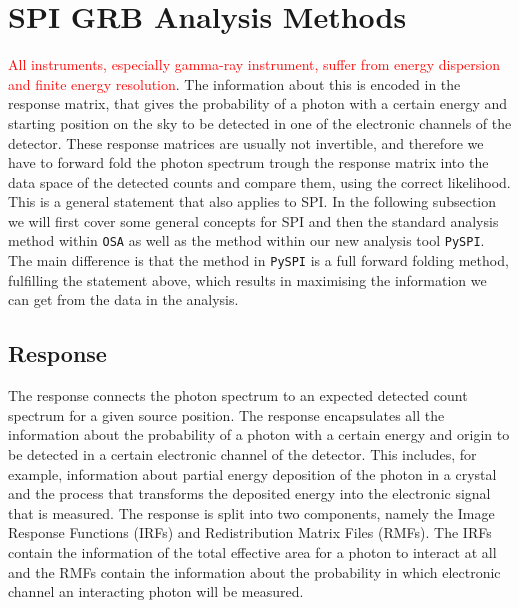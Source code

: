 \documentclass[twocolumn,traditabstract]{aa}
\newcommand{\BB}[1]{\textcolor{red}{\textsf{#1}}}
\begin{document}
\section{SPI GRB Analysis Methods}
\label{methods}
\BB{All instruments, especially gamma-ray instrument, suffer from energy dispersion and finite energy resolution}. The information about this is encoded in the response matrix, that gives the probability of a photon with a certain energy and starting position on the sky to be detected in one of the electronic channels of the detector. These response matrices are usually not invertible, and therefore we have to forward fold the photon spectrum trough the response matrix into the data space of the detected counts and compare them, using the correct likelihood. This is a general statement that also applies to SPI. In the following subsection we will first cover some general concepts for SPI and then the standard analysis method within {\tt OSA} as well as the method within our new analysis tool {\tt PySPI}. The main difference is that the method in {\tt PySPI} is a full forward folding method, fulfilling the statement above, which results in maximising the information we can get from the data in the analysis.

\subsection{Response}
\label{response}

The response connects the photon spectrum to an expected detected count spectrum for a given source position. The response encapsulates all the information about the probability of a photon with a certain energy and origin to be detected in a certain electronic channel of the detector. This includes, for example, information about partial energy deposition of the photon in a crystal and the process that transforms the deposited energy into the electronic signal that is measured.
The response is split into two components, namely the Image Response Functions (IRFs) and Redistribution Matrix Files (RMFs). The IRFs contain the information of the total effective area for a photon to interact at all and the RMFs contain the information about the probability in which electronic channel an interacting photon will be measured.
\end{document}
